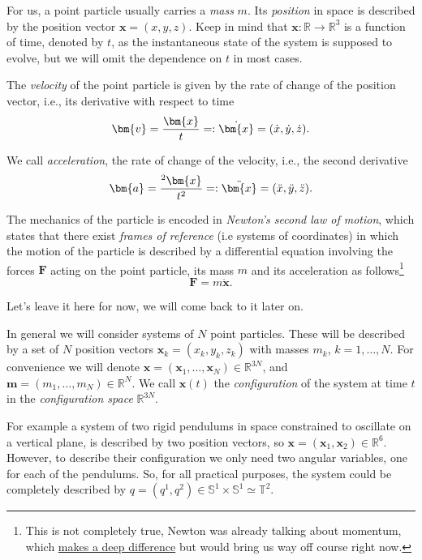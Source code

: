 \documentclass[english,fontsize=11pt,paper=a5,oneside]{scrbook}
\newcommand{\R}{\mathbb{R}}
\newcommand{\T}{\mathbb{T}}
\newcommand{\bS}{\mathbb{S}}
\newcommand{\bx}{\bm{x}}
\newcommand{\bv}{\bm{v}}
\let\d\relax
\newcommand{\d}{\mathrm{d}}
\newcommand{\der}[2]{\frac{\d{#1}}{\d{#2}}}
\theoremstyle{definition}
\newenvironment{example}
  {\pushQED{\qed}\renewcommand{\qedsymbol}{$\lozenge$}\examplex}
  {\popQED\endexamplex}
\begin{document}
For us, a point particle usually carries a \emph{mass} $m$.
Its \emph{position} in space is described by the position vector $\bx = (x, y ,z)$.
Keep in mind that $\bx : \R\to\R^3$ is a function of time, denoted by $t$, as the instantaneous state of the system is supposed to evolve, but we will omit the dependence on $t$ in most cases.

The \emph{velocity} of the point particle is given by the rate of change of the position vector, i.e., its derivative with respect to time
\begin{equation}
  \bv = \der{\bx}{t} =: \dot{\bx} = (\dot{x}, \dot{y}, \dot{z}).
\end{equation}

We call \emph{acceleration}, the rate of change of the velocity, i.e., the second derivative
\begin{equation}
  \bm{a} = \der{^2\bx}{t^2} =: \ddot{\bx} = (\ddot{x}, \ddot{y}, \ddot{z}).
\end{equation}

\begin{tcolorbox}
  The mechanics of the particle is encoded in \emph{Newton's second law of motion}, which states that there exist \emph{frames of reference} (i.e systems of coordinates) in which the motion of the particle is described by a differential equation involving the forces $\bm{F}$ acting on the point particle, its mass $m$ and its acceleration as follows\footnote{This is not completely true, Newton was already talking about momentum, which \href{https://web.archive.org/web/20211201082909/https://bigthink.com/starts-with-a-bang/most-important-equation-physics/}{makes a deep difference} but would bring us way off course right now.}
  \begin{equation}\label{eq:newton}
    \bm F = m \ddot{\bx}.
  \end{equation}
\end{tcolorbox}
Let's leave it here for now, we will come back to it later on.
\medskip

In general we will consider systems of $N$ point particles.
These will be described by a set of $N$ position vectors $\bx_k = (x_k, y_k ,z_k)$ with masses $m_k$, $k = 1, \ldots, N$.
For convenience we will denote $\bx = (\bx_1, \ldots, \bx_N)\in\R^{3N}$, and $\bm{m} = (m_1, \ldots, m_N)\in\R^N$.
We call $\bx(t)$ the \emph{configuration} of the system at time $t$ in the \emph{configuration space} $\R^{3N}$.

\begin{example}\label{example:gcoords}
  For example a system of two rigid pendulums in space constrained to oscillate on a vertical plane, is described by two position vectors, so $\bx = (\bx_1, \bx_2)\in\R^{6}$.
  However, to describe their configuration we only need two angular variables, one for each of the pendulums. So, for all practical purposes, the system could be completely described by $q = (q^1, q^2) \in \bS^1\times\bS^1 \simeq \T^2$.
\end{example}
\end{document}
